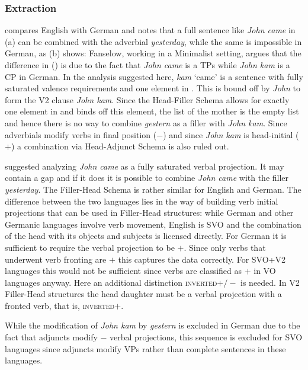 \subsubsection{Extraction}

\citet[]{Fanselow2009b} compares English with German and notes that a full sentence like \emph{John
  came} in (a) can be combined with the adverbial \emph{yesterday}, while the same is
impossible in German, as (b) shows:
\eal
{}
\zl
Fanselow, working in a Minimalist setting, argues that the difference in () is due to the
fact that \emph{John came} is a TPs while \emph{John kam} is a CP in German. In the analysis
suggested here, \emph{kam} `came' is a sentence with fully saturated valence requirements and one
element in \slasch. This is bound off by \emph{John} to form the V2 clause \emph{John kam}. Since
the Head-Filler Schema allows for exactly one element in \slasch and binds off this element, the
\slasch list of the mother is the empty list and hence there is no way to combine \emph{gestern} as
a filler with \emph{John kam}. Since adverbials modify verbs in final position (\initial$-$) and
since \emph{John kam} is head-initial (\initial$+$) a combination via Head-Adjunct Schema is also
ruled out.

\citet{ps2} suggested analyzing \emph{John came} as a fully saturated verbal projection. It may
contain a gap and if it does it is possible to combine \emph{John came} with the filler
\emph{yesterday}. The Filler-Head Schema is rather similar for English and German. The difference
between the two languages lies in the way of building verb initial projections that can be used in Filler-Head structures:
while German and other Germanic languages involve verb movement, English is SVO and the combination of the head with its objects
and subjects is licensed directly. For German it is sufficient to require the verbal projection to
be \initial$+$. Since only verbs that underwent verb fronting are \initial$+$ this captures the data
correctly. For SVO+V2 languages this would not be sufficient since verbs are classified as \initial$+$
in VO languages anyway. Here an additional distinction \textsc{inverted}$+/-$ is needed. In V2
Filler-Head structures the head daughter must be a verbal projection with a fronted verb, that is,
\textsc{inverted}$+$.

While the modification of \emph{John kam} by \emph{gestern} is excluded in German due to the fact
that adjuncts modify \initial$-$ verbal projections, this sequence is excluded for SVO languages
since adjuncts modify VPs rather than complete sentences in these languages. 

